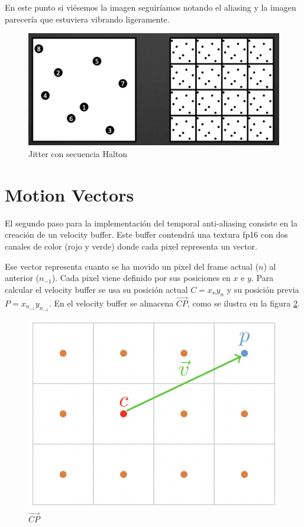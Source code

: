 \documentclass[withindex, glossary]{cam-thesis}
\begin{document}
En este punto si viésemos la imagen seguiríamos notando el aliasing y la imagen parecería que estuviera vibrando ligeramente.

\begin{figure}[!htbp]
    \includegraphics[width=\linewidth]{figures/halton.png}
    \caption{Jitter con secuencia Halton}
    \label{halton}
\end{figure}

\section{Motion Vectors}

El segundo paso para la implementación del temporal anti-aliasing consiste en la creación de un velocity buffer. Este buffer contendrá una textura fp16 con dos canales de color (rojo y verde) donde cada pixel representa un vector.

Ese vector representa cuanto se ha movido un pixel del frame actual ($n$) al anterior ($n_{-1}$). Cada pixel viene definido por sus posiciones en $x$ e $y$. Para calcular el velocity buffer se usa su posición actual $C = x_{n}y_{n}$ y su posición previa $P = x_{n_{-1}}y_{n_{-1}}$. En el velocity buffer se almacena $\vec{CP}$, como se ilustra en la figura \ref{vec}.

\begin{figure}[!htbp]
    \includegraphics[width=.5\linewidth]{figures/vec.png}
    \caption{$\vec{CP}$\cite{filmicsmaa}}
    \label{vec}
\end{figure}
\end{document}
